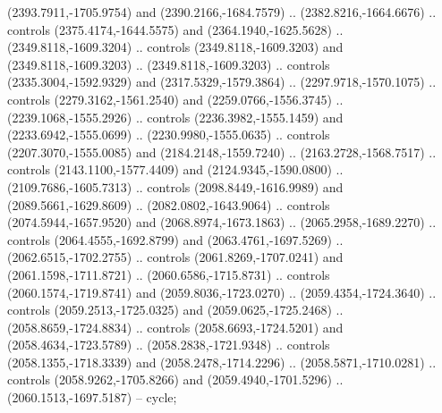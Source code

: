 \begin{scope}[shift={(-24.70323,-217.37029)}]
\begin{scope}[shift={(-1886.1309,2235.3934)}]
\begin{scope}[cm={{1.35882,0.0,0.0,1.35882,(-799.33173,617.61172)}}]
        (2393.7911,-1705.9754) and (2390.2166,-1684.7579) .. (2382.8216,-1664.6676) ..
        controls (2375.4174,-1644.5575) and (2364.1940,-1625.5628) ..
        (2349.8118,-1609.3204) .. controls (2349.8118,-1609.3203) and
        (2349.8118,-1609.3203) .. (2349.8118,-1609.3203) .. controls
        (2335.3004,-1592.9329) and (2317.5329,-1579.3864) .. (2297.9718,-1570.1075) ..
        controls (2279.3162,-1561.2540) and (2259.0766,-1556.3745) ..
        (2239.1068,-1555.2926) .. controls (2236.3982,-1555.1459) and
        (2233.6942,-1555.0699) .. (2230.9980,-1555.0635) .. controls
        (2207.3070,-1555.0085) and (2184.2148,-1559.7240) .. (2163.2728,-1568.7517) ..
        controls (2143.1100,-1577.4409) and (2124.9345,-1590.0800) ..
        (2109.7686,-1605.7313) .. controls (2098.8449,-1616.9989) and
        (2089.5661,-1629.8609) .. (2082.0802,-1643.9064) .. controls
        (2074.5944,-1657.9520) and (2068.8974,-1673.1863) .. (2065.2958,-1689.2270) ..
        controls (2064.4555,-1692.8799) and (2063.4761,-1697.5269) ..
        (2062.6515,-1702.2755) .. controls (2061.8269,-1707.0241) and
        (2061.1598,-1711.8721) .. (2060.6586,-1715.8731) .. controls
        (2060.1574,-1719.8741) and (2059.8036,-1723.0270) .. (2059.4354,-1724.3640) ..
        controls (2059.2513,-1725.0325) and (2059.0625,-1725.2468) ..
        (2058.8659,-1724.8834) .. controls (2058.6693,-1724.5201) and
        (2058.4634,-1723.5789) .. (2058.2838,-1721.9348) .. controls
        (2058.1355,-1718.3339) and (2058.2478,-1714.2296) .. (2058.5871,-1710.0281) ..
        controls (2058.9262,-1705.8266) and (2059.4940,-1701.5296) ..
        (2060.1513,-1697.5187) -- cycle;


\end{scope}
\end{scope}
\end{scope}
